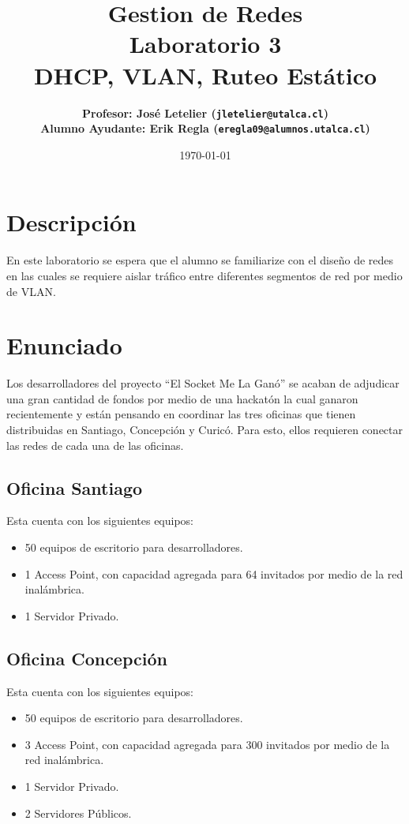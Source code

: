 \documentclass[11pt]{utalcaDoc}
\title{{\bf Gestion de Redes}\\Laboratorio 3\\DHCP, VLAN, Ruteo Estático}
\author{
    \bf{Profesor:} José Letelier (\texttt{jletelier@utalca.cl})\\ 
    \bf{Alumno Ayudante:} Erik Regla (\texttt{eregla09@alumnos.utalca.cl})\\ }
\date{\today}
\begin{document}
\renewcommand{\figurename}{Figura~}
\renewcommand{\tablename}{Tabla~}

\maketitle

\section{Descripción}
En este laboratorio se espera que el alumno se familiarize con el diseño de redes en las cuales se requiere aislar tráfico entre diferentes segmentos de red por medio de VLAN.

\section{Enunciado}
Los desarrolladores del proyecto ``El Socket Me La Ganó'' se acaban de adjudicar una gran cantidad de fondos por medio de una hackatón la cual ganaron recientemente y están pensando en coordinar las tres oficinas que tienen distribuidas en Santiago, Concepción y Curicó. Para esto, ellos requieren conectar las redes de cada una de las oficinas.

\subsection{Oficina Santiago}
Esta cuenta con los siguientes equipos:
\begin{itemize}
    \item{50 equipos de escritorio para desarrolladores.}
    \item{1 Access Point, con capacidad agregada para 64 invitados por medio de la red inalámbrica.}
    \item{1 Servidor Privado.}
\end{itemize}

\subsection{Oficina Concepción}
Esta cuenta con los siguientes equipos:
\begin{itemize}
    \item{50 equipos de escritorio para desarrolladores.}
    \item{3 Access Point, con capacidad agregada para 300 invitados por medio de la red inalámbrica.}
    \item{1 Servidor Privado.}
    \item{2 Servidores Públicos.}
\end{itemize}
\end{document}
